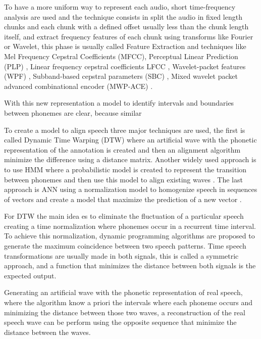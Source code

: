 To have a more uniform way to represent each audio, short time-frequency analysis are used and the technique consists in split the audio in fixed length chunks and each chunk with a defined offset usually less than the chunk length itself, and extract frequency features of each chunk using transforms like Fourier or Wavelet, this phase is usually called Feature Extraction and techniques like Mel Frequency Cepstral Coefficients (MFCC)\cite{Davis1980ComparisonSentences}, Perceptual Linear Prediction (PLP) \cite{Hermansky1990PerceptualSpeech}, Linear frequency cepstral coefficients LFCC \cite{Davis1980ComparisonSentences}, Wavelet-packet features (WPF) \cite{Farooq2001MelRecognition}, Subband-based cepstral parameters (SBC) \cite{Sarikaya98waveletpacket}, Mixed wavelet packet advanced combinational encoder (MWP-ACE) \cite{NogueiraWaveletImplants}.

With this new representation a model to identify intervals and boundaries between phonemes are clear, because similar 

To create a model to align speech three major techniques are used, the first is called Dynamic Time Warping (DTW) \cite{Sakoe1978DynamicRecognition} where an artificial wave with the phonetic representation of the annotation is created and then an alignment algorithm minimize the difference using a distance matrix. Another widely used approach is to use HMM where a probabilistic model is created to represent the transition between phonemes and then use this model to align existing waves \cite{RabinerARecognition}. The last approach is ANN using a normalization model to homogenize speech in sequences of vectors and create a model that maximize the prediction of a new vector \cite{Deng2012}.

For DTW the main idea es to eliminate the fluctuation of a particular speech creating a time normalization where phonemes occur in a recurrent time interval. To achieve this normalization, dynamic programming algorithms are proposed to generate the maximum coincidence between two speech patterns. Time speech transformations are usually made in both signals, this is called a symmetric approach, and a function that minimizes the distance between both signals is the expected output. 

Generating an artificial wave with the phonetic representation of real speech, where the algorithm know a priori the intervals where each phoneme occurs and minimizing the distance between those two waves, a reconstruction of the real speech wave can be perform using the opposite sequence that minimize the distance between the waves.

